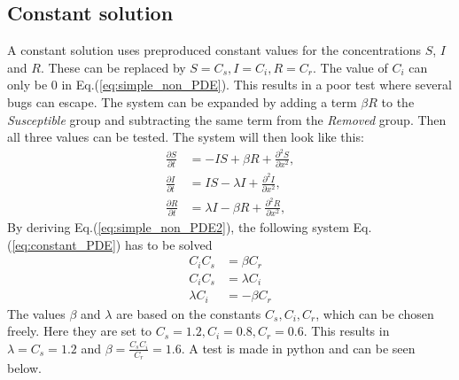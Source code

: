 \documentclass[%
twoside,                 %
final,                   %
chapterprefix=true,      %
open=right               %
10pt]{book}
\begin{document}
\subsection{Constant solution}
A constant solution uses preproduced constant values for the concentrations $S$, $I$ and $R$. These can be replaced by $S = C_s,I=C_i,R=C_r$. The value of $C_i$ can only be 0 in Eq.(\ref{eq:simple_non_PDE}). This results in a poor test where several bugs can escape. The system can be expanded by adding a term $\beta R$ to the \emph{Susceptible} group and subtracting the same term from the \emph{Removed} group. Then all three values can be tested. The system will then look like this: 
\begin{equation} \label{eq:simple_non_PDE2}
	\begin{aligned}
	\frac{\partial S}{\partial t} &= -IS + \beta R + \frac{\partial^2 S}{\partial x^2},\\
	\frac{\partial I}{\partial t} &= IS- \lambda I + \frac{\partial^2 I}{\partial x^2},\\
	\frac{\partial R}{\partial t} &= \lambda I - \beta R + \frac{\partial^2 R}{\partial x^2},
	\end{aligned}
\end{equation}
By deriving Eq.(\ref{eq:simple_non_PDE2}), the following system Eq.(\ref{eq:constant_PDE}) has to be solved
\begin{equation} \label{eq:constant_PDE}
	\begin{aligned}
	C_iC_s &= \beta C_r \\
	C_iC_s &= \lambda C_i \\
	\lambda C_i &= -\beta C_r 
	\end{aligned}
\end{equation}
The values $\beta$ and $\lambda$ are based on the constants $C_s,C_i,C_r$, which can be chosen freely. Here they are set to $C_s = 1.2,C_i=0.8,C_r=0.6$. This results in $\lambda= C_s = 1.2$ and $\beta= \frac{C_s C_i}{C_r}=1.6$. A test is made in python and can be seen below.
\end{document}
